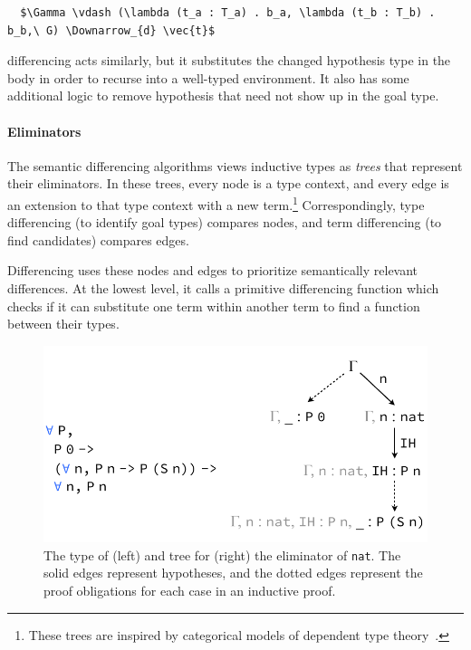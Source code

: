 \begin{lstlisting}
  $\Gamma \vdash (\lambda (t_a : T_a) . b_a, \lambda (t_b : T_b) . b_b,\ G) \Downarrow_{d} \vec{t}$
\end{lstlisting}
differencing acts similarly, but it substitutes the changed hypothesis type in the body in order to recurse into a well-typed environment.
It also has some additional logic to remove hypothesis that need not show up in the goal type.

\paragraph{Eliminators} %
The semantic differencing algorithms views inductive types as \emph{trees} that represent their eliminators.
In these trees, every node is a type context, and every edge is an extension to that type context 
with a new term.\footnote{These trees are inspired by categorical models of dependent type theory~\cite{Hofmann97}.}
Correspondingly, type differencing (to identify goal types) compares nodes, 
and term differencing (to find candidates) compares edges. 

Differencing uses these nodes and edges to prioritize semantically
relevant differences. At the lowest level, it calls a primitive differencing function 
which checks if it can substitute one term within another term to find a function between their types.

\begin{figure}[t]
\begin{center}
\includegraphics[scale=0.55]{repair/nat_ind}
\end{center}
\caption{The type of (left) and tree for (right) the eliminator of \lstinline{nat}. The solid edges represent hypotheses, and the dotted edges represent the proof obligations for each case in an inductive proof.} %
\label{fig:cattree}
\end{figure}

